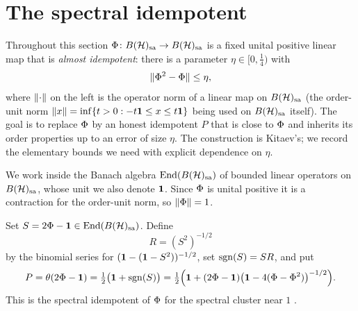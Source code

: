 \section{The spectral idempotent}\label{sec:spectral}

Throughout this section $\Phi\colon B(\mathcal{H})_{\mathrm{sa}}\to B(\mathcal{H})_{\mathrm{sa}}$ is a fixed unital positive
linear map that is \emph{almost idempotent}: there is a parameter
$\eta\in[0,\tfrac14)$ with
\begin{equation}\label{eq:eta-hypothesis}
  \lVert \Phi^2-\Phi \rVert\le\eta,
\end{equation}
where $\lVert \cdot \rVert$ on the left is the operator norm of a linear map on
$B(\mathcal{H})_{\mathrm{sa}}$ (the order-unit norm $\lVert x \rVert=\inf\{t>0:-t\mathbf{1}\le x\le t\mathbf{1}\}$ being
used on $B(\mathcal{H})_{\mathrm{sa}}$ itself). The goal is to replace $\Phimap$ by an honest
idempotent $P$ that is close to $\Phimap$ and inherits its order properties up
to an error of size $\eta$. The construction is Kitaev's; we record the
elementary bounds we need with explicit dependence on $\eta$.

We work inside the Banach algebra $\mathrm{End}(B(\mathcal{H})_{\mathrm{sa}})$ of bounded linear
operators on $B(\mathcal{H})_{\mathrm{sa}}$, whose unit we also denote $\mathbf{1}$. Since $\Phimap$ is
unital positive it is a contraction for the order-unit norm, so
$\lVert \Phi \rVert=1$.

\begin{definition}\label{def:spectral-idempotent}
Set $S=2\Phi-\mathbf{1}\in\mathrm{End}(B(\mathcal{H})_{\mathrm{sa}})$. Define
\begin{equation}\label{eq:R-binomial}
  R=(S^2)^{-1/2}
\end{equation}
by the binomial series for $(\mathbf{1}-(\mathbf{1}-S^2))^{-1/2}$, set
$\operatorname{sgn}(S)=SR$, and put
\begin{equation}\label{eq:P-def}
  P=\theta(2\Phi-\mathbf{1})=\tfrac12\bigl(\mathbf{1}+\operatorname{sgn}(S)\bigr)
   =\tfrac12\Bigl(\mathbf{1}+(2\Phi-\mathbf{1})\bigl(\mathbf{1}-4(\Phi-\Phi^2)\bigr)^{-1/2}\Bigr).
\end{equation}
This is the spectral idempotent of $\Phimap$ for the spectral cluster near
$1$ \cite[Eq.~(tilde\_$\Phimap$), Prop.~P]{Kitaev2024}.
\end{definition}

